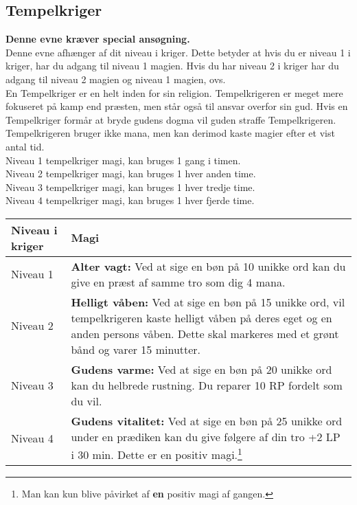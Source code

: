 \subsection*{Tempelkriger}
\textbf{Denne evne kræver special ansøgning.}\\
Denne evne afhænger af dit niveau i kriger. Dette betyder at hvis du er niveau 1 i kriger, har du adgang til niveau 1 magien. Hvis du har niveau 2 i kriger har du adgang til niveau 2 magien og niveau 1 magien, ovs.\\
En Tempelkriger er en helt inden for sin religion. Tempelkrigeren er meget mere fokuseret på kamp end præsten, men står også til ansvar overfor sin gud. Hvis en Tempelkriger formår at bryde gudens dogma vil guden straffe Tempelkrigeren. Tempelkrigeren bruger ikke mana, men kan derimod kaste magier efter et vist antal tid.\\
Niveau 1 tempelkriger magi, kan bruges 1 gang i timen.\\
Niveau 2 tempelkriger magi, kan bruges 1 hver anden time.\\
Niveau 3 tempelkriger magi, kan bruges 1 hver tredje time.\\
Niveau 4 tempelkriger magi, kan bruges 1 hver fjerde time.\\

\begin{table}[H]
    \centering
    \begin{tabular}{|p{}|p{}|}
    \rowcolor{cerulean!80}\hline
        Niveau i kriger & Magi \\\hline
        Niveau 1 & \textbf{Alter vagt:} Ved at sige en bøn på 10 unikke ord kan du give en præst af samme tro som dig 4 mana.\\\hline
        Niveau 2 & \textbf{Helligt våben:} Ved at sige en bøn på 15 unikke ord, vil tempelkrigeren kaste helligt våben på deres eget og en anden persons våben. Dette skal markeres med et grønt bånd og varer 15 minutter. \\\hline
        Niveau 3 & \textbf{Gudens varme:} Ved at sige en bøn på 20 unikke ord kan du helbrede rustning. Du reparer 10 RP fordelt som du vil.\\\hline
        Niveau 4 & \textbf{Gudens vitalitet:} Ved at sige en bøn på 25 unikke ord under en prædiken kan du give følgere af din tro +2 LP i 30 min. Dette er en positiv magi.\footnote{Man kan kun blive påvirket af \textbf{en} positiv magi af gangen.}\\\hline
    \end{tabular}
\end{table}
